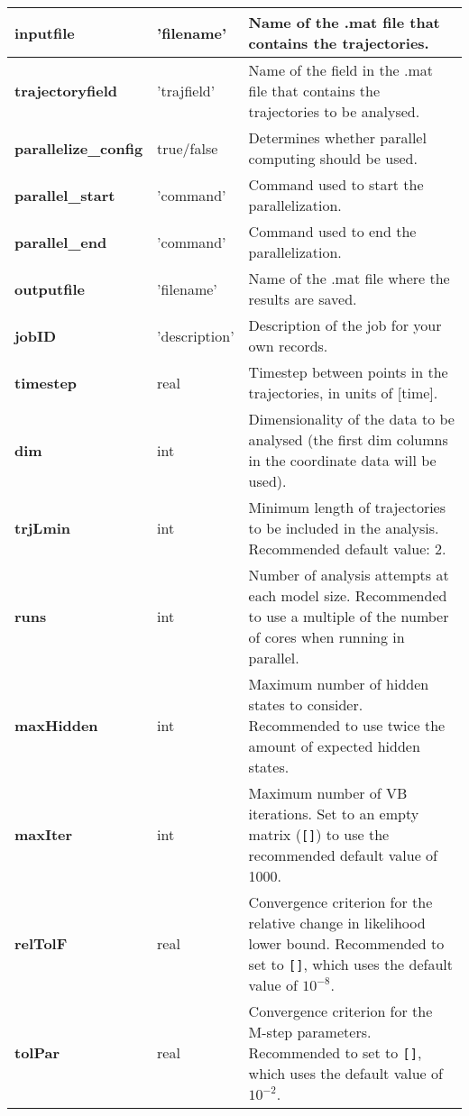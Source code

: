 \begin{longtable}{|m{}|>{\centering\arraybackslash}m{}|m{}|}
\textbf{inputfile}						&	  'filename'						&		Name of the .mat file that contains the trajectories.\\ [0.5ex]  \hline 
\textbf{trajectoryfield}				&	  'trajfield'							&		Name of the field in the .mat file that contains the trajectories to be analysed.\\ [0.5ex]  \hline 
\textbf{parallelize\_config}		&	  true/false						&		Determines whether parallel computing should be used.\\ [0.5ex]  \hline 
\textbf{parallel\_start}				&	  'command'						&		Command used to start the parallelization.\\ [0.5ex]  \hline 
\textbf{parallel\_end}				&	  'command'						&		Command used to end the parallelization.\\ [0.5ex]  \hline 
\textbf{outputfile	}					&	  'filename'						&		Name of the .mat file where the results are saved.\\ [0.5ex]  \hline 
\textbf{jobID}							&	  'description'					&		Description of the job for your own records.\\ [0.5ex]  \hline 
\textbf{timestep}						&	  real								&		Timestep between points in the trajectories, in units of [time].\\ [0.5ex]  \hline 
\textbf{dim}								&	  int							&		Dimensionality of the data to be analysed (the first dim columns in the coordinate data will be used).\\ [0.5ex]  \hline 
\textbf{trjLmin}						&	  int									&		Minimum length of trajectories to be included in the analysis. Recommended default value: 2.\\ [0.5ex]  \hline 
\textbf{runs}							&	  int								&		Number of analysis attempts at each model size. Recommended to use a multiple of the number of cores when running in parallel.\\ [0.5ex]  \hline 
\textbf{maxHidden}					&	  int								&		Maximum number of hidden states to consider. Recommended to use twice the amount of expected hidden states.\\ [0.5ex]  \hline 
\textbf{maxIter}						&	  int									&		Maximum number of VB iterations. Set to an empty matrix (\texttt{[]}) to use the recommended default value of 1000.\\ [0.5ex]  \hline 
\textbf{relTolF}						&	  real									&		Convergence criterion for the relative change in likelihood lower bound. Recommended to set to \texttt{[]}, which uses the default value of $10^{-8}$.\\[0.5ex]  \hline 
\textbf{tolPar}							&	  real									&		Convergence criterion for the M-step parameters. Recommended to set to \texttt{[]}, which uses the default value of $10^{-2}$.\\[0.5ex]  \hline 

\end{longtable}

